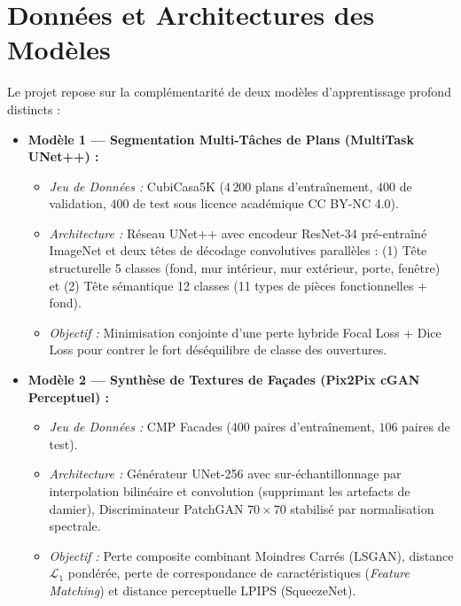 \documentclass[11pt,a4paper]{report}
\begin{document}
\section{Données et Architectures des Modèles}
Le projet repose sur la complémentarité de deux modèles d'apprentissage profond distincts :
\begin{itemize}
    \item \textbf{Modèle 1 --- Segmentation Multi-Tâches de Plans (MultiTask UNet++) :}
    \begin{itemize}
        \item \emph{Jeu de Données :} CubiCasa5K ($4\,200$ plans d'entraînement, $400$ de validation, $400$ de test sous licence académique CC BY-NC 4.0).
        \item \emph{Architecture :} Réseau UNet++ avec encodeur ResNet-34 pré-entraîné ImageNet et deux têtes de décodage convolutives parallèles : (1) Tête structurelle 5 classes (fond, mur intérieur, mur extérieur, porte, fenêtre) et (2) Tête sémantique 12 classes (11 types de pièces fonctionnelles + fond).
        \item \emph{Objectif :} Minimisation conjointe d'une perte hybride Focal Loss + Dice Loss pour contrer le fort déséquilibre de classe des ouvertures.
    \end{itemize}
    \item \textbf{Modèle 2 --- Synthèse de Textures de Façades (Pix2Pix cGAN Perceptuel) :}
    \begin{itemize}
        \item \emph{Jeu de Données :} CMP Facades ($400$ paires d'entraînement, $106$ paires de test).
        \item \emph{Architecture :} Générateur UNet-256 avec sur-échantillonnage par interpolation bilinéaire et convolution (supprimant les artefacts de damier), Discriminateur PatchGAN $70 \times 70$ stabilisé par normalisation spectrale.
        \item \emph{Objectif :} Perte composite combinant Moindres Carrés (LSGAN), distance $\mathcal{L}_1$ pondérée, perte de correspondance de caractéristiques (\emph{Feature Matching}) et distance perceptuelle LPIPS (SqueezeNet).
    \end{itemize}
\end{itemize}

\newpage

\end{document}
